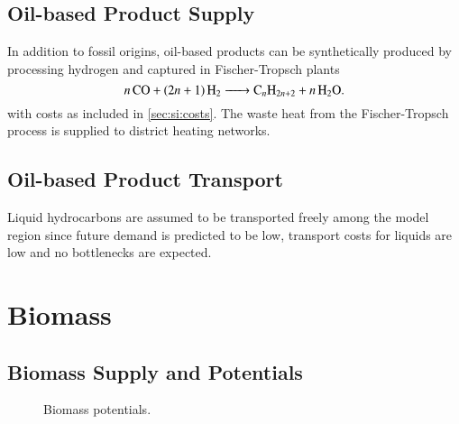 \subsection{Oil-based Product Supply}
\label{sec:si:oil:supply}

In addition to fossil origins, oil-based products can be synthetically produced
by processing hydrogen and captured \co in Fischer-Tropsch plants
\begin{equation}
    \ce{$n$CO + ($2n$ + 1)H2 -> C_$n$H_{2n+2} + $n$H2O}.
\end{equation}
with costs as included in \cref{sec:si:costs}. The waste heat from the
Fischer-Tropsch process is supplied to district heating networks.

\subsection{Oil-based Product Transport}
\label{sec:si:oil:transport}

Liquid hydrocarbons are assumed to be transported freely among the model region
since future demand is predicted to be low, transport costs for liquids are low
and no bottlenecks are expected.

\section{Biomass}
\label{sec:si:bio}



\subsection{Biomass Supply and Potentials}
\label{sec:si:bio:potentials}

\begin{figure}
    \centering
    \caption{Biomass potentials.}
    \label{fig:biomass-potentials}
\end{figure}

